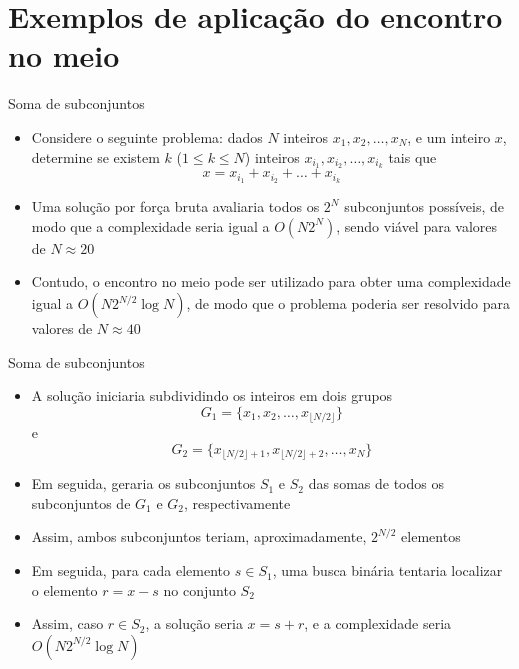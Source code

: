 \section{Exemplos de aplicação do encontro no meio}

\begin{frame}[fragile]{Soma de subconjuntos}

    \begin{itemize}
        \item Considere o seguinte problema: dados $N$ inteiros $x_1, x_2, \ldots, x_N$, e um
            inteiro $x$, determine se existem $k$ ($1\leq k\leq N$) inteiros 
            $x_{i_1}, x_{i_2}, \ldots, x_{i_k}$ tais que
            \[
                x = x_{i_1} + x_{i_2} + \ldots + x_{i_k}
            \] 

        \item Uma solução por força bruta avaliaria todos os $2^N$ subconjuntos possíveis, de modo
            que a complexidade seria igual a $O(N2^N)$, sendo viável para valores de $N \approx 20$

        \item Contudo, o encontro no meio pode ser utilizado para obter uma complexidade
            igual a $O(N2^{N/2}\log N)$, de modo que o problema poderia ser resolvido para valores de
            $N\approx 40$
       
    \end{itemize}

\end{frame}

\begin{frame}[fragile]{Soma de subconjuntos}

    \begin{itemize}
        \item A solução iniciaria subdividindo os inteiros em dois grupos
        \[
            G_1 = \lbrace x_1, x_2, \ldots, x_{\lfloor N/2\rfloor}\rbrace
        \]
        e
        \[
            G_2 = \lbrace x_{\lfloor N/2\rfloor + 1}, x_{\lfloor N/2\rfloor + 2}, \ldots, x_{N}\rbrace
        \]

        \item Em seguida, geraria os subconjuntos $S_1$ e $S_2$ das somas de todos os subconjuntos de
            $G_1$ e $G_2$, respectivamente

        \item Assim, ambos subconjuntos teriam, aproximadamente, $2^{N/2}$ elementos

        \item Em seguida, para cada elemento $s\in S_1$, uma busca binária tentaria localizar o
            elemento $r = x - s$ no conjunto $S_2$

        \item Assim, caso $r\in S_2$, a solução seria $x = s + r$, e a complexidade seria
            $O(N2^{N/2}\log N)$
    \end{itemize}

\end{frame}

